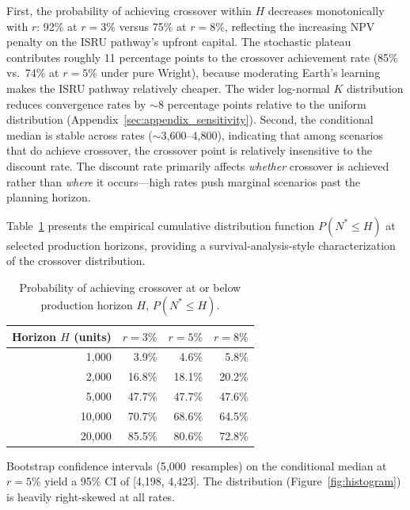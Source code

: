 \documentclass[preprint,12pt]{elsarticle}
\begin{document}
First, the probability of achieving crossover within $H$ decreases monotonically with $r$: 92\% at $r = 3\%$ versus 75\% at $r = 8\%$, reflecting the increasing NPV penalty on the ISRU pathway's upfront capital. The stochastic plateau contributes roughly 11 percentage points to the crossover achievement rate (85\% vs.\ 74\% at $r = 5\%$ under pure Wright), because moderating Earth's learning makes the ISRU pathway relatively cheaper. The wider log-normal $K$ distribution reduces convergence rates by $\sim$8 percentage points relative to the uniform distribution (Appendix~\ref{sec:appendix_sensitivity}). Second, the conditional median is stable across rates ($\sim$3{,}600--4{,}800), indicating that among scenarios that do achieve crossover, the crossover point is relatively insensitive to the discount rate. The discount rate primarily affects \emph{whether} crossover is achieved rather than \emph{where} it occurs---high rates push marginal scenarios past the planning horizon.

Table~\ref{tab:convergence} presents the empirical cumulative distribution function $P(N^* \leq H)$ at selected production horizons, providing a survival-analysis-style characterization of the crossover distribution.

\begin{table}[htbp]
\centering
\caption{Probability of achieving crossover at or below production horizon $H$, $P(N^* \leq H)$.}
\label{tab:convergence}
\small
\begin{tabular}{@{}rrrr@{}}
\toprule
Horizon $H$ (units) & $r = 3\%$ & $r = 5\%$ & $r = 8\%$ \\
\midrule
1{,}000  & 3.9\% & 4.6\% & 5.8\% \\
2{,}000  & 16.8\% & 18.1\% & 20.2\% \\
5{,}000  & 47.7\% & 47.7\% & 47.6\% \\
10{,}000 & 70.7\% & 68.6\% & 64.5\% \\
20{,}000 & 85.5\% & 80.6\% & 72.8\% \\
\bottomrule
\end{tabular}
\end{table}

Bootstrap confidence intervals (5{,}000~resamples) on the conditional median at $r = 5\%$ yield a 95\% CI of [4{,}198, 4{,}423]. The distribution (Figure~\ref{fig:histogram}) is heavily right-skewed at all rates.
\end{document}
